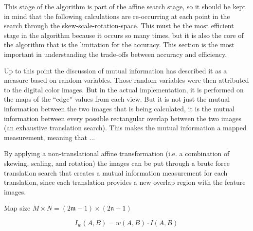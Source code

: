 %
%
%
%
%
%
%
%
%

%
%
%



This stage of the algorithm is part of the affine search stage, so it should be kept in mind that the following calculations are re-occurring at each point in the search through the skew-scale-rotation-space. This must be the most efficient stage in the algorithm because it occurs so many times, but it is also the core of the algorithm that is the limitation for the accuracy. This section is the most important in understanding the trade-offs between accuracy and efficiency.

Up to this point the discussion of mutual information has described it as a measure based on random variables. Those random variables were then attributed to the digital color images. But in the actual implementation, it is performed on the maps of the ``edge'' values from each view. But it is not just the mutual information between the two images that is being calculated, it is the mutual information between every possible rectangular overlap between the two images (an exhaustive translation search). This makes the mutual information a mapped measurement, meaning that ...


By applying a non-translational affine transformation (i.e. a combination of skewing, scaling, and rotation) the images can be put through a brute force translation search that creates a mutual information measurement for each translation, since each translation provides a new overlap region with the feature images.

Map size $M \times N = (2\mathfrak{m}-1) \times (2\mathfrak{n}-1)$

\begin{equation}
\label{WeightedInformation}
	I_{w}(A,B)=w(A,B) \cdot I(A,B)
\end{equation}


